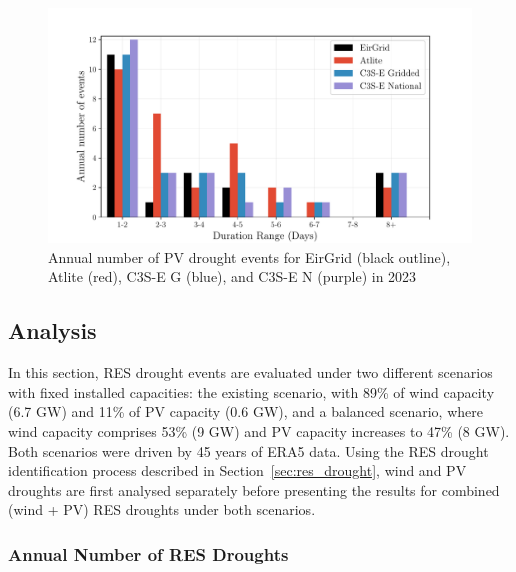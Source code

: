 \documentclass[a4paper, 11pt]{article}
\begin{document}
\begin{figure}[!ht]
	\centering
	\includegraphics[width=\textwidth]{verification_pv_bar}
	\caption{Annual number of PV drought events for EirGrid (black outline), Atlite (red), C3S-E G (blue), and C3S-E N (purple) in 2023}
	\label{fig:bar_number_events_verification_pv}
\end{figure}

\newpage
\subsection{Analysis}
\label{sec:Analysis}

In this section, RES drought events are evaluated under two different scenarios with fixed installed capacities: the existing scenario, with 89\% of wind capacity (6.7 GW) and 11\% of PV capacity (0.6 GW), and a balanced scenario, where wind capacity comprises 53\% (9 GW) and PV capacity increases to 47\% (8 GW). Both scenarios were driven by 45 years of ERA5 data. Using the RES drought identification process described in Section~\ref{sec:res_drought}, wind and PV droughts are first analysed separately before presenting the results for combined (wind + PV) RES droughts under both scenarios.

\subsubsection{Annual Number of RES Droughts}
\end{document}
